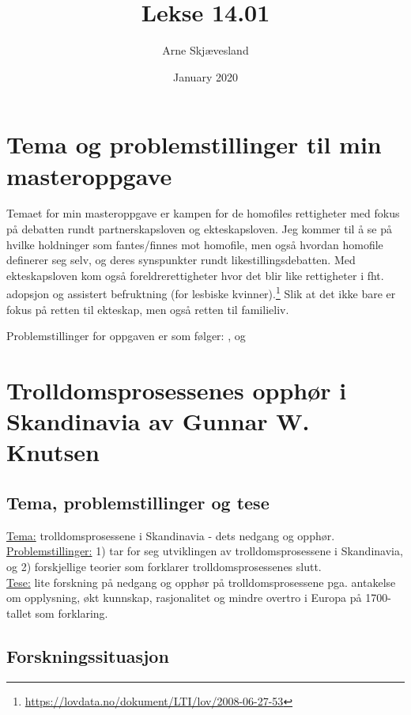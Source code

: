 \documentclass[12pt]{article}
\title{Lekse 14.01}
\author{Arne Skjævesland}
\date{January 2020}
\begin{document}
\maketitle

\section{Tema og problemstillinger til min masteroppgave}
Temaet for min masteroppgave er kampen for de homofiles rettigheter med fokus på debatten rundt partnerskapsloven og ekteskapsloven. 
Jeg kommer til å se på hvilke holdninger som fantes/finnes mot homofile, men også hvordan homofile definerer seg selv, og deres synspunkter rundt likestillingsdebatten. Med ekteskapsloven kom også foreldrerettigheter hvor det blir like rettigheter i fht. 
adopsjon og assistert befruktning (for lesbiske  kvinner).\footnote{\url{https://lovdata.no/dokument/LTI/lov/2008-06-27-53}} Slik at 
det ikke bare er fokus på retten til ekteskap, men også retten til familieliv.

Problemstillinger for oppgaven er som følger: , og 

\section{Trolldomsprosessenes opphør i Skandinavia av Gunnar W. Knutsen}

\subsection{Tema, problemstillinger og tese}
\underline{Tema:} trolldomsprosessene i Skandinavia - dets nedgang og opphør. \\
\underline{Problemstillinger:} 1) tar for seg utviklingen av trolldomsprosessene i Skandinavia, og 2) forskjellige teorier som 
forklarer trolldomsprosessenes slutt. \\
\underline{Tese:} lite forskning på nedgang og opphør på trolldomsprosessene pga. antakelse om opplysning, økt kunnskap, rasjonalitet 
og mindre overtro i Europa på 1700-tallet som forklaring.

\subsection{Forskningssituasjon}
\end{document}
